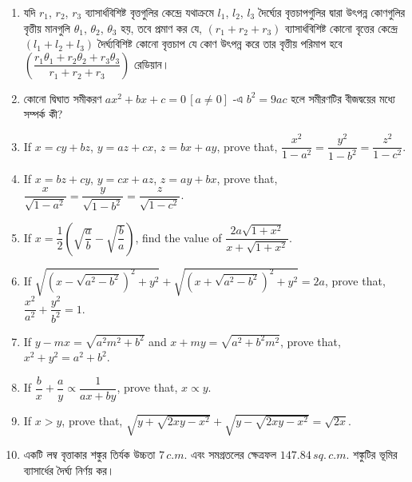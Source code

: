 \documentclass[11pt, a4paper]{article}
\begin{document}
\begin{enumerate}
	\item \textbengali{যদি} $r_1$, $r_2$, $r_3$ \textbengali{ব্যাসার্ধবিশিষ্ট বৃত্তগুলির কেন্দ্রে যথাক্রমে} $l_1$, $l_2$, $l_3$ \textbengali{দৈর্ঘ্যের বৃত্তচাপগুলির দ্বারা উৎপন্ন কোণগুলির বৃত্তীয় মানগুলি} $\theta_1$, $\theta_2$, $\theta_3$ \textbengali{হয়, তবে প্রমাণ কর যে,} $\left( r_1 + r_2 + r_3 \right)$ \textbengali{ব্যাসার্ধবিশিষ্ট কোনো বৃত্তের কেন্দ্রে} $\left( l_1 + l_2 + l_3 \right)$ \textbengali{দৈর্ঘ্যবিশিষ্ট কোনো বৃত্তচাপ যে কোণ উৎপন্ন করে তার বৃত্তীয় পরিমাপ হবে} $\left( \dfrac{r_1 \theta_1 + r_2 \theta_2 + r_3 \theta_3}{r_1 + r_2 + r_3} \right)$ \textbengali{রেডিয়ান।} 
	
	\item \textbengali{কোনো দ্বিঘাত সমীকরণ} $ax^2 + bx + c = 0 \, [a \neq 0]$ \textbengali{-এ} $b^2 = 9ac$ \textbengali{হলে সমীরণটির বীজদ্বয়ের মধ্যে সম্পর্ক কী?}
	
	\item If $x = cy + bz$, $y = az + cx$, $z = bx + ay$, prove that, $\dfrac{x^2}{1-a^2} = \dfrac{y^2}{1-b^2} = \dfrac{z^2}{1-c^2}$.
	
	\item If $x = bz + cy$, $y = cx + az$, $z = ay + bx$, prove that, $\dfrac{x}{\sqrt{1-a^2}} = \dfrac{y}{\sqrt{1-b^2}} = \dfrac{z}{\sqrt{1-c^2}}$.
	
	\item If $x = \dfrac{1}{2} \left( \sqrt{\dfrac{a}{b}} - \sqrt{\dfrac{b}{a}}\right)$, find the value of $\dfrac{2a\sqrt{1+x^2}}{x+\sqrt{1+x^2}}$.
	
	\item If $\sqrt{\left(x - \sqrt{a^2 - b^2}\right)^2 + y^2} + \sqrt{\left(x + \sqrt{a^2 - b^2}\right)^2 + y^2} = 2a$, prove that, $\dfrac{x^2}{a^2} + \dfrac{y^2}{b^2} = 1$.
	
	\item If $y - mx = \sqrt{a^2 m^2 + b^2}$ and $x + my = \sqrt{a^2 + b^2 m^2}$, prove that, $x^2 + y^2 = a^2 + b^2$.
	
	\item If $\dfrac{b}{x} + \dfrac{a}{y} \propto \dfrac{1}{ax+by}$, prove that, $x \propto y$.
	
	\item If $x > y$, prove that, $\sqrt{y + \sqrt{2xy - x^2}} + \sqrt{y - \sqrt{2xy - x^2}} = \sqrt{2x}$.
	
	\item \textbengali{একটি লম্ব বৃত্তাকার শঙ্কুর তির্যক উচ্চতা} $7 \, c.m.$ \textbengali{এবং সমগ্রতলের ক্ষেত্রফল} $147.84 \, sq. \, c.m.$ \textbengali{শঙ্কুটির ভূমির ব্যাসার্ধের দৈর্ঘ্য নির্ণয় কর।}
	

\end{enumerate}
\end{document}
